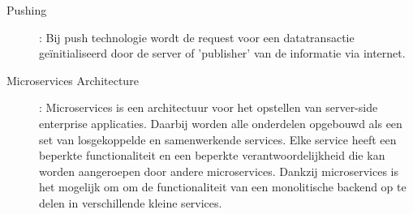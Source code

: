 \begin{description}
\item[Pushing]: Bij push technologie wordt de request voor een datatransactie ge\"initialiseerd door de server of 'publisher' van de informatie via internet.
\item[Microservices Architecture]: Microservices is een architectuur voor het opstellen van server-side enterprise applicaties. Daarbij worden alle onderdelen opgebouwd als een set van losgekoppelde en samenwerkende services. Elke service heeft een beperkte functionaliteit en een beperkte verantwoordelijkheid die kan worden aangeroepen door andere microservices. Dankzij microservices is het mogelijk om om de functionaliteit van een monolitische backend op te delen in verschillende kleine services.
\end{description}
